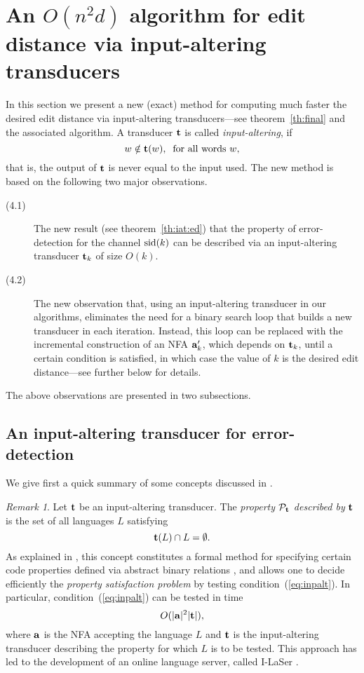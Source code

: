 \documentclass{article}
\theoremstyle{plain}
\theoremstyle{definition}
\theoremstyle{remark}
\newtheorem{remark}[theorem]{Remark}
\newcommand{\cP}{\ensuremath{\mathcal{P}}\xspace}
\newcommand{\cpt}{\cP_{\trt}}
\begin{document}
\section{An $O(n^2d)$ algorithm for edit distance via input-altering transducers}\label{sec:iat}
In this section we present a new (exact) method for computing much faster the desired edit distance via input-altering transducers---see theorem~\ref{th:final} and the associated algorithm.
A transducer $\mathbf{t}$ is called \emph{input-altering}, if
\[
w\notin\mathbf{t}(w),\>\hbox{ for all words $w$,}
\]
that is, the output of $\mathbf{t}$ is never equal to the input used. The new method is based on the following two major observations.
\begin{description}
  \item[(4.1)] The new result (see theorem~\ref{th:iat:ed}) that the property of error-detection for the channel $\mathrm{sid}(k)$ can be described via an input-altering transducer $\mathbf{t}_k$ of size $O(k)$.
  \item[(4.2)] The new observation that, using an input-altering transducer in our algorithms, eliminates the need for a binary search loop that builds a new transducer in each iteration. Instead, this loop can be replaced with the incremental construction of an NFA $\mathbf{a}'_k$, which depends on $\mathbf{t}_k$, until a certain condition is satisfied, in which case the value of $k$ is the desired edit distance---see further below for details.
\end{description}
The above observations are presented in two subsections.

\subsection{An input-altering transducer for error-detection}
We give first a quick summary of some concepts discussed
in \cite{DudKon:2012}.

\begin{remark}\label{rem:iat}
Let $\mathbf{t}$ be an input-altering transducer. The \emph{property
$\cpt$ described by} $\mathbf{t}$ is the set of all languages $L$ satisfying
\begin{equation}\label{eq:inpalt}
\mathbf{t}(L)\cap L=\emptyset.
\end{equation}
As explained in \cite{DudKon:2012}, this concept constitutes a formal method for specifying certain code properties defined via abstract
binary relations \cite{Shyr:Thierrin:relations}, and allows one to decide efficiently the
\emph{property satisfaction problem} by testing
condition~(\ref{eq:inpalt}). In particular, condition~(\ref{eq:inpalt}) can be tested
in time
\begin{equation}\label{eq:cxty4}
O(|\mathbf{a}|^2|\mathbf{t}|),
\end{equation}
where $\mathbf{a}$ is the NFA accepting the language $L$
and $\mathbf{t}$ is the input-altering transducer
describing the property for which $L$ is to be tested.
This approach has led to the development of an
online language  server, called I-LaSer \cite{ilaser}.
\end{remark}
\end{document}
